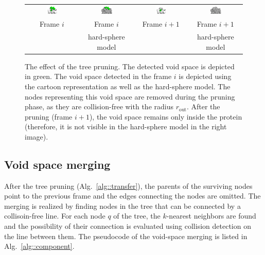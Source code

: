 \documentclass[usletter, 10pt, conference]{svjour3}      %
\def\gprobe{r_{\mathrm{out}}}
\begin{document}
\begin{figure}
\centering
{
\renewcommand{\tabcolsep}{1pt}
\begin{tabular}{cccc}
\includegraphics[width=0.24\textwidth]{fig/688a} &
\includegraphics[width=0.24\textwidth]{fig/688b} & 
\includegraphics[width=0.24\textwidth]{fig/688d} &
\includegraphics[width=0.24\textwidth]{fig/688c} \\
Frame $i$ & Frame $i$ &  Frame $i+1$ & Frame $i+1$ \\
          & hard-sphere model & & hard-sphere model
\end{tabular}
}
\caption{\label{fig::tp2}
The effect of the tree pruning.
The detected void space is depicted in green.
The void space detected in the frame $i$ is depicted using the cartoon representation as well as the hard-sphere model.
The nodes representing this void space are removed during the pruning phase, as they are collision-free with the radius $\gprobe$.
After the pruning (frame $i+1$), the void space remains only inside the protein (therefore, it is not visible in the hard-sphere
model in the right image).
}
\end{figure}

\subsection{Void space merging}

After the tree  pruning (Alg.~\ref{alg::transfer}), the parents of the surviving nodes point to the previous frame and the edges connecting the nodes are omitted.
The merging is realized by finding nodes in the tree that can be connected by a collisoin-free line.
For each node $q$ of the tree, the $k$-nearest neighbors are found and the possibility of their connection is evaluated using collision
detection on the line between them.
The pseudocode of the void-space merging is listed in Alg.~\ref{alg::component}.
\end{document}
